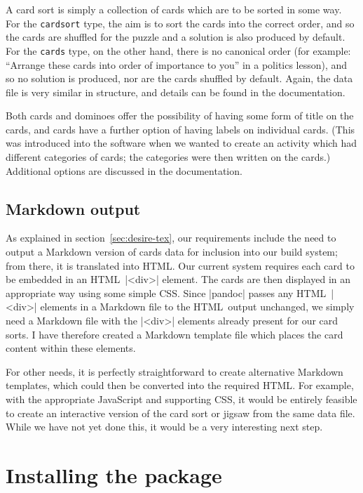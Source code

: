 \documentclass{article}
\def\HTML{{\small HTML}}
\def\CSS{{\small CSS}}
\begin{document}
A card sort is simply a collection of cards which are to be sorted in
some way.  For the \texttt{cardsort} type, the aim is to sort the cards into
the correct order, and so the cards are shuffled for the puzzle and a
solution is also produced by default.  For the \texttt{cards} type, on the
other hand, there is no canonical order (for example: ``Arrange these
cards into order of importance to you'' in a politics
lesson), and so no solution is produced, nor are the cards shuffled by
default.  Again, the data file is very similar in structure, and
details can be found in the documentation.

Both cards and dominoes offer the possibility of having some form of
title on the cards, and cards have a further option of having labels
on individual cards.  (This was introduced into the software when we
wanted to create an activity which had different categories of cards;
the categories were then written on the cards.)  Additional options
are discussed in the documentation.

\subsection{Markdown output}

As explained in section~\ref{sec:desire-tex}, our requirements include
the need to output a Markdown version of cards data for inclusion into
our build system; from there, it is translated into \HTML.  Our
current system requires each card to be embedded in an \HTML\
|<div>| element.  The cards are then displayed in an appropriate
way using some simple \CSS.  Since |pandoc| passes any \HTML\
|<div>| elements in a Markdown file to the \HTML\ output
unchanged, we simply need a Markdown file with the |<div>|
elements already present for our card sorts.  I have therefore created
a Markdown template file which places the card content within these
elements.

For other needs, it is perfectly straightforward to create alternative
Markdown templates, which could then be converted into the required
\HTML.  For example, with the appropriate JavaScript and supporting
\CSS, it would be entirely feasible to create an interactive version
of the card sort or jigsaw from the same data file.  While we have not
yet done this, it would be a very interesting next step.

\section{Installing the package}
\end{document}
